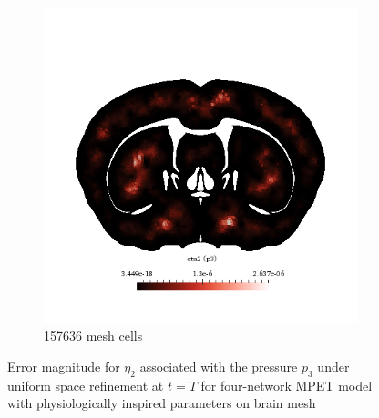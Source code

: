 \begin{figure}[h!]
\begin{subfigure}[b]{0.49\textwidth}
    \includegraphics[width=\textwidth,height=\textheight,keepaspectratio,height=\textheight,keepaspectratio]{figures/4_mpet/biomedical/space/eta2_p3_2.png}
    \caption{157636 mesh cells}
  \end{subfigure}
  \caption{Error magnitude for $\eta_2$ associated with the pressure $p_3$ under uniform space refinement at $t=T$ for four-network MPET model with physiologically inspired parameters on brain mesh} \label{fig:mpet4_eta2_p3}
\end{figure}

